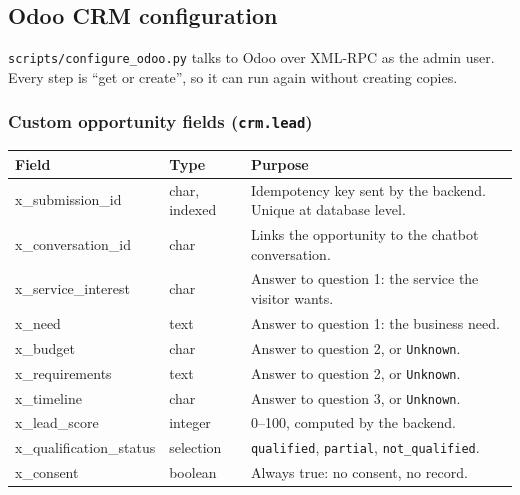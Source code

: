 \documentclass[11pt,a4paper]{article}
\newcommand{\f}[1]{\texttt{#1}}
\begin{document}
\subsection{Odoo CRM configuration}

\f{scripts/configure\_odoo.py} talks to Odoo over XML-RPC as the admin user. Every step is
``get or create'', so it can run again without creating copies.

\subsubsection*{Custom opportunity fields (\f{crm.lead})}

\begin{tabularx}{\textwidth}{>{\ttfamily}l l Y}
  \toprule
  \textrm{\textbf{Field}} & \textbf{Type} & \textbf{Purpose} \\
  \midrule
  x\_submission\_id & char, indexed & Idempotency key sent by the backend. Unique at database level. \\
  x\_conversation\_id & char & Links the opportunity to the chatbot conversation. \\
  x\_service\_interest & char & Answer to question 1: the service the visitor wants. \\
  x\_need & text & Answer to question 1: the business need. \\
  x\_budget & char & Answer to question 2, or \f{Unknown}. \\
  x\_requirements & text & Answer to question 2, or \f{Unknown}. \\
  x\_timeline & char & Answer to question 3, or \f{Unknown}. \\
  x\_lead\_score & integer & 0--100, computed by the backend. \\
  x\_qualification\_status & selection & \f{qualified}, \f{partial}, \f{not\_qualified}. \\
  x\_consent & boolean & Always true: no consent, no record. \\
  \bottomrule
\end{tabularx}
\end{document}
